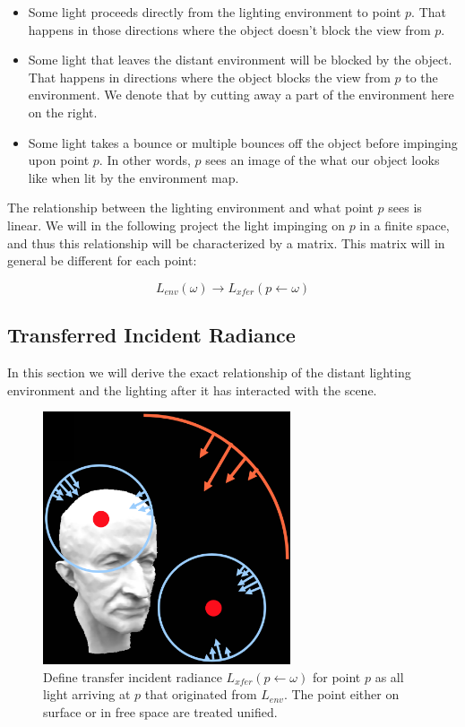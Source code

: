 \begin{itemize}
	\item Some light proceeds directly from the lighting environment to point $p$. That happens in those directions where the object doesn't block the view from $p$.
	\item Some light that leaves the distant environment will be blocked by the object. That happens in directions where the object blocks the view from $p$ to the environment. We denote that by cutting away a part of the environment here on the right.
	\item Some light takes a bounce or multiple bounces off the object before impinging upon point $p$. In other words, $p$ sees an image of the what our object looks like when lit by the environment map.
\end{itemize}

The relationship between the lighting environment and what point $p$ sees is linear. We will in the following project the light impinging on $p$ in a finite space, and thus this relationship will be characterized by a matrix. This matrix will in general be different for each point:

\begin{equation*}
	L_{env}(\omega)\to L_{xfer}(p\leftarrow\omega)
\end{equation*}



\subsection{Transferred Incident Radiance}
In this section we will derive the exact relationship of the distant lighting environment and the lighting after it has interacted with the scene.

\begin{figure}
\sidecaption
	\includegraphics[width=0.65\textwidth]{graphics/prt/prt-9}
	\caption{Define transfer incident radiance $L_{xfer}(p\leftarrow\omega)$ for point $p$ as all light arriving at $p$ that originated from $L_{env}$. The point either on surface or in free space are treated unified.}
	\label{f:prt-matrix}
\end{figure}

